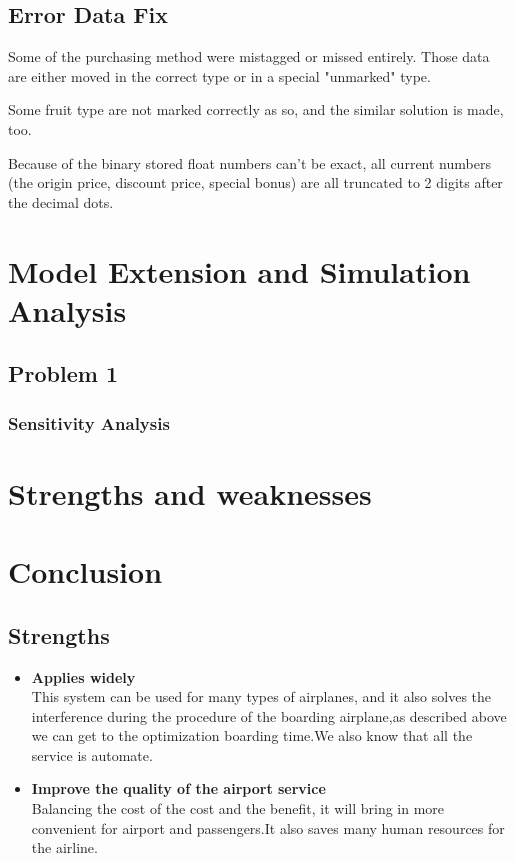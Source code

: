 \documentclass{mcmthesis}
\begin{document}
\subsection{Error Data Fix}

Some of the purchasing method were mistagged or missed entirely. Those data are either moved in the correct type or in a special "unmarked" type.

Some fruit type are not marked correctly as so, and the similar solution is made, too.

Because of the binary stored float numbers can't be exact, all current numbers (the origin price, discount price, special bonus) are all truncated to 2 digits after the decimal dots.
\section{Model Extension and Simulation Analysis}
\subsection{Problem 1}

\subsubsection{Sensitivity Analysis}

\section{Strengths and weaknesses}

\section{Conclusion}

\subsection{Strengths}
\begin{itemize}
\item \textbf{Applies widely}\\
This  system can be used for many types of airplanes, and it also
solves the interference during  the procedure of the boarding
airplane,as described above we can get to the  optimization
boarding time.We also know that all the service is automate.
\item \textbf{Improve the quality of the airport service}\\
Balancing the cost of the cost and the benefit, it will bring in
more convenient  for airport and passengers.It also saves many
human resources for the airline.\cite{1}
\end{itemize}
\end{document}
